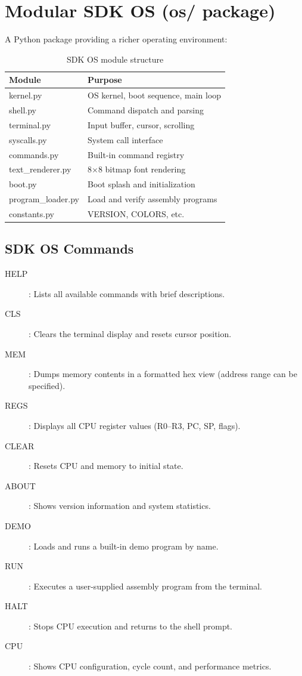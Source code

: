 \documentclass[12pt,a4paper,twoside]{book}
\theoremstyle{trinarytheorem}
\theoremstyle{trinarydefinition}
\newcommand{\code}[1]{\textsf{#1}}
\begin{document}
\section{Modular SDK OS (\code{os/} package)}

A Python package providing a richer operating environment:

\begin{table}[H]
\centering
\caption{SDK OS module structure}
\label{tab:sdkos}
\begin{tabular}{ll}
\toprule
Module & Purpose \\
\midrule
\code{kernel.py} & OS kernel, boot sequence, main loop \\
\code{shell.py} & Command dispatch and parsing \\
\code{terminal.py} & Input buffer, cursor, scrolling \\
\code{syscalls.py} & System call interface \\
\code{commands.py} & Built-in command registry \\
\code{text\_renderer.py} & 8$\times$8 bitmap font rendering \\
\code{boot.py} & Boot splash and initialization \\
\code{program\_loader.py} & Load and verify assembly programs \\
\code{constants.py} & VERSION, COLORS, etc. \\
\bottomrule
\end{tabular}
\end{table}

\subsection{SDK OS Commands}

\begin{description}
    \item[\code{HELP}]: Lists all available commands with brief descriptions.
    \item[\code{CLS}]: Clears the terminal display and resets cursor position.
    \item[\code{MEM}]: Dumps memory contents in a formatted hex view (address range
          can be specified).
    \item[\code{REGS}]: Displays all CPU register values (R0--R3, PC, SP, flags).
    \item[\code{CLEAR}]: Resets CPU and memory to initial state.
    \item[\code{ABOUT}]: Shows version information and system statistics.
    \item[\code{DEMO}]: Loads and runs a built-in demo program by name.
    \item[\code{RUN}]: Executes a user-supplied assembly program from the terminal.
    \item[\code{HALT}]: Stops CPU execution and returns to the shell prompt.
    \item[\code{CPU}]: Shows CPU configuration, cycle count, and performance metrics.
\end{description}
\end{document}
